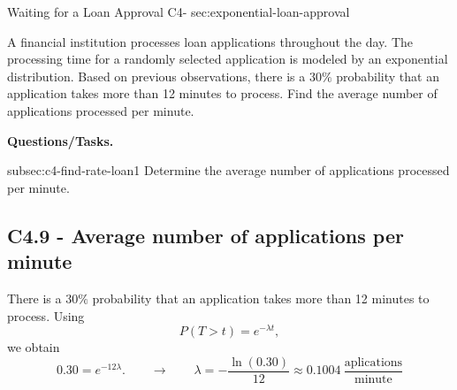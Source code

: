 	
	\sectionScored
	{Waiting for a Loan Approval}
	{C4-}
	{sec:exponential-loan-approval}
	{
		A financial institution processes loan applications throughout the
		day. The processing time for a randomly selected application is
		modeled by an exponential distribution. Based on previous observations,
		there is a \(30\%\) probability that an application takes more than
		12 minutes to process. Find the average number of applications
		processed per minute.
		
		\textbf{Questions/Tasks.}
		\begin{enumerate}
			\CriterionTask
			{subsec:c4-find-rate-loan}{1}
			{Determine the average number of applications processed per minute.
				}
		\end{enumerate}
		
		\subsection*{C4.9 - Average number of applications per minute}
		\label{subsec:c4-find-rate-loan}
		
		There is a \(30\%\) probability that an application takes more than
		12 minutes to process. Using
		\[
		P(T>t)=e^{-\lambda t},
		\]
		we obtain
		\[
		0.30=e^{-12\lambda}.
		\qquad \longrightarrow \qquad
		\lambda=-\frac{\ln(0.30)}{12}
		\approx \boxed{0.1004  \>\frac{\text{aplications}}{\text{minute}}}
		\]
		
	}
	
